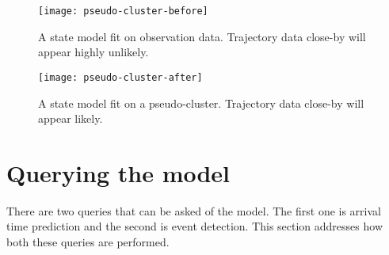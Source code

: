 \begin{figure}
  \begin{minipage}{.46\textwidth}
    \texttt{[image: pseudo-cluster-before]}
    \caption{A state model fit on observation data. Trajectory data close-by
    will appear highly unlikely.}\label{fig:pseudo-cluster-before}
  \end{minipage}
  \hspace{5pt}
  \begin{minipage}{.46\textwidth}
    \texttt{[image: pseudo-cluster-after]}
    \caption{A state model fit on a pseudo-cluster. Trajectory data close-by
    will appear likely.}\label{fig:pseudo-cluster-after}
  \end{minipage}
\end{figure}

\section{Querying the model}
There are two queries that can be asked of the model. The first one is
arrival time prediction and the second is event detection. This
section addresses how both these queries are performed.

